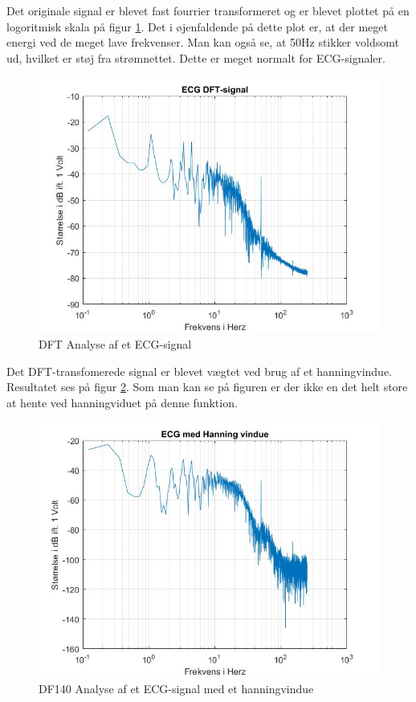Det originale signal er blevet fast fourrier transformeret og er blevet plottet på en logoritmisk skala på figur \ref{fig:ECG DFT}. Det i øjenfaldende på dette plot er, at der meget energi ved de meget lave frekvenser. Man kan også se, at 50Hz stikker voldsomt ud, hvilket er støj fra strømnettet. Dette er meget normalt for ECG-signaler.
\begin{figure}[H]
	\centering
	\includegraphics[width=140mm]{figures/ECG/DFT.jpg}
	\caption{DFT Analyse af et ECG-signal}
	\label{fig:ECG DFT}
\end{figure}

Det DFT-transfomerede signal er blevet vægtet ved brug af et hanningvindue. Resultatet ses på figur \ref{fig:ECG hanning}. Som man kan se på figuren er der ikke en det helt store at hente ved hanningviduet på denne funktion.
\begin{figure}[H]
	\centering
	\includegraphics[width=140mm]{figures/ECG/hanning.jpg}
	\caption{DF140 Analyse af et ECG-signal med et hanningvindue}
	\label{fig:ECG hanning}
\end{figure}

